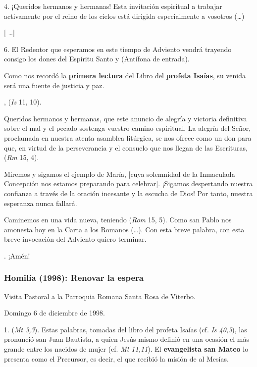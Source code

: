 \begin{body}
\begin{body}
	4. ¡Queridos hermanos y hermanas! Esta invitación espiritual a trabajar activamente por el reino de los cielos está dirigida especialmente a vosotros (\ldots{})
	
	{[} \ldots{}{]}
	
	6. El Redentor que esperamos en este tiempo de Adviento vendrá trayendo consigo los dones del Espíritu Santo y  (Antífona de entrada).
	
	Como nos recordó la \textbf{primera lectura} del Libro del \textbf{profeta Isaías}, su venida será una fuente de justicia y paz.
	
	,  (\emph{Is} 11, 10).
	
	Queridos hermanos y hermanas, que este anuncio de alegría y victoria definitiva sobre el mal y el pecado sostenga vuestro camino espiritual. La alegría del Señor, proclamada en nuestra atenta asamblea litúrgica, se nos ofrece como un don para que, en virtud de la perseverancia y el consuelo que nos llegan de las Escrituras,  (\emph{Rm} 15, 4).
	
	Miremos y sigamos el ejemplo de María, {[}cuya solemnidad de la Inmaculada Concepción nos estamos preparando para celebrar{]}. ¡Sigamos despertando nuestra confianza a través de la oración incesante y la escucha de Dios! Por tanto, nuestra esperanza nunca fallará.
	
	Caminemos en una vida nueva, teniendo  (\emph{Rom} 15, 5). Como san Pablo nos amonesta hoy en la Carta a los Romanos (\ldots{}). Con esta breve palabra, con esta breve invocación del Adviento quiero terminar.
	
	. ¡Amén!
	
	\subsubsection{Homilía (1998): Renovar la espera}
	
	Visita Pastoral a la Parroquia Romana Santa Rosa de Viterbo.
	
	Domingo 6 de diciembre de 1998.
	
	1.  (\emph{Mt 3,3}). Estas palabras, tomadas del libro del profeta Isaías (cf. \emph{Is 40,3}), las pronunció san Juan Bautista, a quien Jesús mismo definió en una ocasión el más grande entre los nacidos de mujer (cf. \emph{Mt 11,11}). El \textbf{evangelista san Mateo} lo presenta como el Precursor, es decir, el que recibió la misión de  al Mesías.
	

\end{body}
\end{body}
